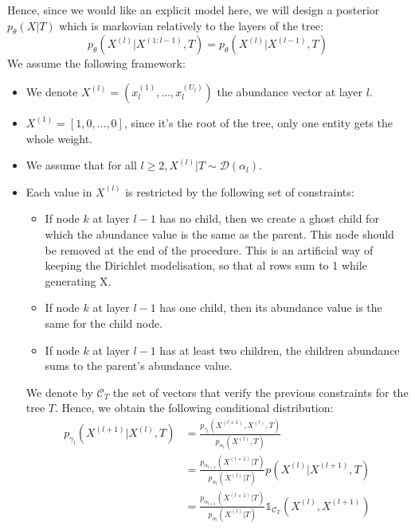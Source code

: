 Hence, since we would like an explicit model here, we will design a posterior $p_{\theta}(X|T)$ which is markovian relatively to the layers of the tree:
$$
p_{\theta}(X^{(l)} | X^{(1:l-1)}, T) = p_{\theta}(X^{(l)} | X^{(l-1)}, T)
$$
We assume the following framework:
\begin{itemize}
    \item We denote $X^{(l)} = (x_l^{(1)}, \dots, x_{l}^{(U_l)})$ the abundance vector at layer $l$.
    \item $X^{(1)} = [1, 0, \dots, 0]$, since it's the root of the tree, only one entity gets the whole weight.
    \item We assume that for all $l \geq 2, X^{(l)} | T \sim \mathcal{D}(\alpha_l)$.
    \item Each value in $X^{(l)}$ is restricted by the following set of constraints:
        \begin{itemize}
              \item If node $k$ at layer $l-1$ has no child, then we create a ghost child for which the abundance value is the same as the parent.
                    This node should be removed at the end of the procedure.
                    This is an artificial way of keeping the Dirichlet modelisation, so that al rows sum to 1 while generating X.
              \item If node $k$ at layer $l-1$ has one child, then its abundance value is the same for the child node.
              \item If node $k$ at layer $l-1$ has at least two children, the children abundance sums to the parent's abundance value.
        \end{itemize}
        We denote by $\mathcal{C}_T$ the set of vectors that verify the previous constraints for the tree $T$.
        Hence, we obtain the following conditional distribution:
        $$
        \begin{align}
            p_{\gamma_l}(X^{(l+1)} | X^{(l)}, T) &= \frac{p_{\gamma_l}(X^{(l+1)}, X^{(l)}, T)}{p_{\alpha_l}(X^{(l)}, T)} \\
                                            &= \frac{p_{\alpha_{l+1}}(X^{(l+1)} | T)}{p_{\alpha_{l}}(X^{(l)} | T)} p(X^{(l)} | X^{(l+1)}, T) \\
                                            &= \frac{p_{\alpha_{l+1}}(X^{(l+1)} | T)}{p_{\alpha_{l}}(X^{(l)} | T)} \mathds{1}_{\mathcal{C}_T}\left(X^{(l)}, X^{(l+1)}\right)
        \end{align}
        $$
\end{itemize}


